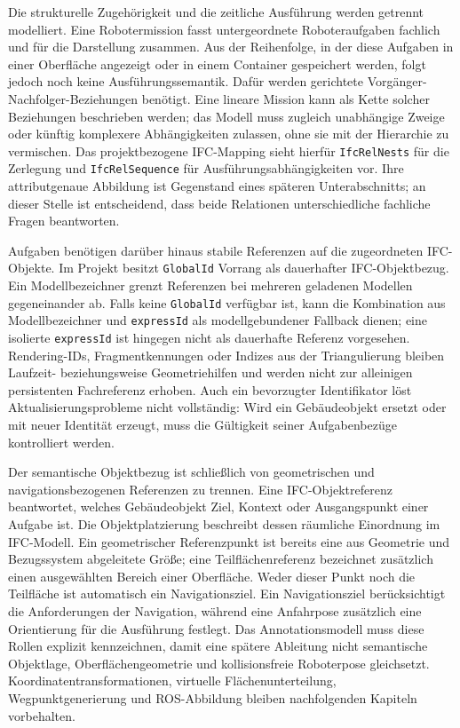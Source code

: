 Die strukturelle Zugehörigkeit und die zeitliche Ausführung werden getrennt modelliert. Eine Robotermission fasst
untergeordnete Roboteraufgaben fachlich und für die Darstellung zusammen. Aus der Reihenfolge, in der diese Aufgaben in
einer Oberfläche angezeigt oder in einem Container gespeichert werden, folgt jedoch noch keine Ausführungssemantik.
Dafür werden gerichtete Vorgänger-Nachfolger-Beziehungen benötigt. Eine lineare Mission kann als Kette solcher
Beziehungen beschrieben werden; das Modell muss zugleich unabhängige Zweige oder künftig komplexere Abhängigkeiten
zulassen, ohne sie mit der Hierarchie zu vermischen. Das projektbezogene IFC-Mapping sieht hierfür \texttt{IfcRelNests}
für die Zerlegung und \texttt{IfcRelSequence} für Ausführungsabhängigkeiten vor. Ihre attributgenaue Abbildung ist
Gegenstand eines späteren Unterabschnitts; an dieser Stelle ist entscheidend, dass beide Relationen unterschiedliche
fachliche Fragen beantworten.

Aufgaben benötigen darüber hinaus stabile Referenzen auf die zugeordneten IFC-Objekte. Im Projekt besitzt
\texttt{GlobalId} Vorrang als dauerhafter IFC-Objektbezug. Ein Modellbezeichner grenzt Referenzen bei mehreren geladenen
Modellen gegeneinander ab. Falls keine \texttt{GlobalId} verfügbar ist, kann die Kombination aus Modellbezeichner und
\texttt{expressId} als modellgebundener Fallback dienen; eine isolierte \texttt{expressId} ist hingegen nicht als
dauerhafte Referenz vorgesehen. Rendering-IDs, Fragmentkennungen oder Indizes aus der Triangulierung bleiben Laufzeit-
beziehungsweise Geometriehilfen und werden nicht zur alleinigen persistenten Fachreferenz erhoben. Auch ein bevorzugter
Identifikator löst Aktualisierungsprobleme nicht vollständig: Wird ein Gebäudeobjekt ersetzt oder mit neuer Identität
erzeugt, muss die Gültigkeit seiner Aufgabenbezüge kontrolliert werden.

Der semantische Objektbezug ist schließlich von geometrischen und navigationsbezogenen Referenzen zu trennen. Eine
IFC-Objektreferenz beantwortet, welches Gebäudeobjekt Ziel, Kontext oder Ausgangspunkt einer Aufgabe ist. Die
Objektplatzierung beschreibt dessen räumliche Einordnung im IFC-Modell. Ein geometrischer Referenzpunkt ist bereits eine
aus Geometrie und Bezugssystem abgeleitete Größe; eine Teilflächenreferenz bezeichnet zusätzlich einen ausgewählten
Bereich einer Oberfläche. Weder dieser Punkt noch die Teilfläche ist automatisch ein Navigationsziel. Ein
Navigationsziel berücksichtigt die Anforderungen der Navigation, während eine Anfahrpose zusätzlich eine Orientierung
für die Ausführung festlegt. Das Annotationsmodell muss diese Rollen explizit kennzeichnen, damit eine spätere Ableitung
nicht semantische Objektlage, Oberflächengeometrie und kollisionsfreie Roboterpose gleichsetzt.
Koordinatentransformationen, virtuelle Flächenunterteilung, Wegpunktgenerierung und ROS-Abbildung bleiben nachfolgenden
Kapiteln vorbehalten.

